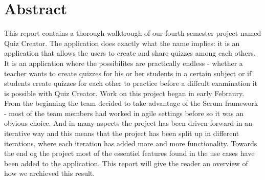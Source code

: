 \chapter*{Abstract}
This report contains a thorough walktrough of our fourth semester project named Quiz Creator. The application does exactly what the name implies: it is an application that allows the users to create and share quizzes among each others. It is an application where the possibilites are practically endless - whether a teacher wants to create quizzes for his or her students in a certain subject or if students create quizzes for each other to practice before a diffcult examination it is possible with Quiz Creator. 
Work on this project began in early Febraury. From the beginning the team decided to take advantage of the Scrum framework - most of the team members had worked in agile settings before so it was an obvious choice. And in many aspects the project has been driven forward in an iterative way and this means that the project has been split up in different iterations, where each iteration has added more and more functionality. 
Towards the end og the project most of the essentiel features found in the use cases have been added to the application. This report will give the reader an overview of how we archieved this result. 
